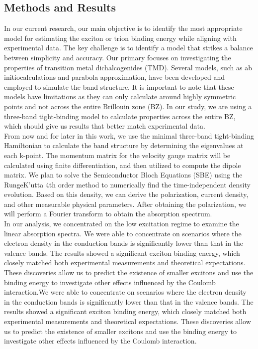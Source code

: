 \documentclass[12pt,english,a4paper]{article}
\begin{document}
	\subsection{Methods and Results}
	\quad In our current research, our main objective is to identify the most appropriate model for estimating the exciton or trion binding energy while aligning with experimental data. The key challenge is to identify a model that strikes a balance between simplicity and accuracy. Our primary focuses on investigating the properties of transition metal dichalcogenides (TMD). Several models, such as ab initiocalculations\cite{kirichenko_influence_2021,ramasubramaniam_large_2012,qiu_optical_2013,cheiwchanchamnangij_quasiparticle_2012,shi_quasiparticle_2013} and parabola approximation\cite{meckbach_ultrafast_2020,berkelbach_theory_2013}, have been developed and employed to simulate the band structure. It is important to note that these models have limitations as they can only calculate around highly symmetric points and not across the entire Brillouin zone (BZ). In our study, we are using a three-band tight-binding model to calculate properties across the entire BZ, which should give us results that better match experimental data.\\\null
	\quad From now and for later in this work, we use the minimal three-band tight-binding Hamiltonian\cite{liu_three-band_2013} to calculate the band structure by determining the eigenvalues at each k-point. The momentum matrix for the velocity gauge matrix will be calculated using finite differentiation, and then utilized to compute the dipole matrix. We plan to solve the Semiconductor Bloch Equations (SBE) using the RungeK'utta 4th order method to numerically find the time-independent density evolution. Based on this density, we can derive the polarization, current density, and other measurable physical parameters. After obtaining the polarization, we will perform a Fourier transform to obtain the absorption spectrum.\\\null	
	\quad In our analysis, we concentrated on the low excitation regime to examine the linear absorption spectra. We were able to concentrate on scenarios where the electron density in the conduction bands is significantly lower than that in the valence bands. The results showed a significant exciton binding energy, which closely matched both experimental measurements and theoretical expectations. These discoveries allow us to predict the existence of smaller excitons and use the binding energy to investigate other effects influenced by the Coulomb interaction.We were able to concentrate on scenarios where the electron density in the conduction bands is significantly lower than that in the valence bands. The results showed a significant exciton binding energy, which closely matched both experimental measurements and theoretical expectations. These discoveries allow us to predict the existence of smaller excitons and use the binding energy to investigate other effects influenced by the Coulomb interaction.
	
\end{document}
